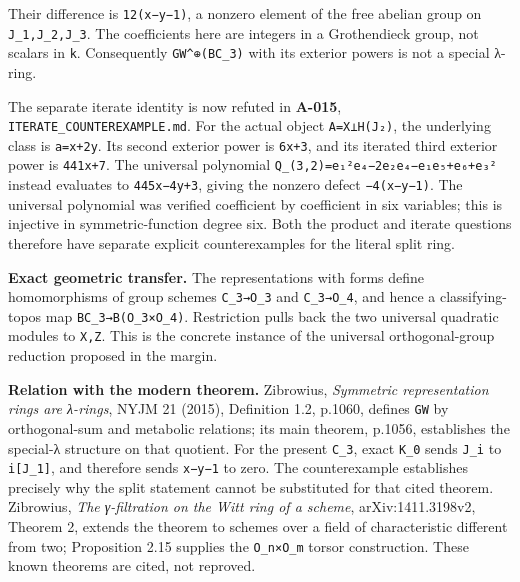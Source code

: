 \documentclass[
  10pt,
]{article}
\begin{document}
Their difference is \texttt{\small 12(\allowbreak{}x−y−1)\allowbreak{}},
a nonzero element of the free abelian group on
\texttt{\small J\_\allowbreak{}1,\allowbreak{}J\_\allowbreak{}2,\allowbreak{}J\_\allowbreak{}3}.
The coefficients here are integers in a Grothendieck group, not scalars
in \texttt{\small k}. Consequently
\texttt{\small GW\textasciicircum{}⊕\allowbreak{}(\allowbreak{}BC\_\allowbreak{}3)\allowbreak{}}
with its exterior powers is not a special λ-ring.

The separate iterate identity is now refuted in \textbf{A-015},
\texttt{\small ITERATE\_\allowbreak{}COUNTEREXAMPLE.md}. For the actual
object \texttt{\small A=\allowbreak{}X⊥H(\allowbreak{}J₂)\allowbreak{}},
the underlying class is
\texttt{\small a=\allowbreak{}x+\allowbreak{}2y}. Its second exterior
power is \texttt{\small 6x+\allowbreak{}3}, and its iterated third
exterior power is \texttt{\small 441x+\allowbreak{}7}. The universal
polynomial
\texttt{\small Q\_\allowbreak{}(\allowbreak{}3,\allowbreak{}2)\allowbreak{}=\allowbreak{}e₁²e₄−2e₂e₄−e₁e₅+\allowbreak{}e₆+\allowbreak{}e₃²}
instead evaluates to \texttt{\small 445x−4y+\allowbreak{}3}, giving the
nonzero defect \texttt{\small −4(\allowbreak{}x−y−1)\allowbreak{}}. The
universal polynomial was verified coefficient by coefficient in six
variables; this is injective in symmetric-function degree six. Both the
product and iterate questions therefore have separate explicit
counterexamples for the literal split ring.

\textbf{Exact geometric transfer.} The representations with forms define
homomorphisms of group schemes
\texttt{\small C\_\allowbreak{}3→\allowbreak{}O\_\allowbreak{}3} and
\texttt{\small C\_\allowbreak{}3→\allowbreak{}O\_\allowbreak{}4}, and
hence a classifying-topos map
\texttt{\small BC\_\allowbreak{}3→\allowbreak{}B(\allowbreak{}O\_\allowbreak{}3×O\_\allowbreak{}4)\allowbreak{}}.
Restriction pulls back the two universal quadratic modules to
\texttt{\small X,\allowbreak{}Z}. This is the concrete instance of the
universal orthogonal-group reduction proposed in the margin.

\textbf{Relation with the modern theorem.} Zibrowius, \emph{Symmetric
representation rings are λ-rings}, NYJM 21 (2015), Definition 1.2,
p.1060, defines \texttt{\small GW} by orthogonal-sum and metabolic
relations; its main theorem, p.1056, establishes the special-λ structure
on that quotient. For the present \texttt{\small C\_\allowbreak{}3},
exact \texttt{\small K\_\allowbreak{}0} sends
\texttt{\small J\_\allowbreak{}i} to
\texttt{\small i[\allowbreak{}J\_\allowbreak{}1]\allowbreak{}}, and
therefore sends \texttt{\small x−y−1} to zero. The counterexample
establishes precisely why the split statement cannot be substituted for
that cited theorem. Zibrowius, \emph{The γ-filtration on the Witt ring
of a scheme}, arXiv:1411.3198v2, Theorem 2, extends the theorem to
schemes over a field of characteristic different from two; Proposition
2.15 supplies the \texttt{\small O\_\allowbreak{}n×O\_\allowbreak{}m}
torsor construction. These known theorems are cited, not reproved.
\end{document}
